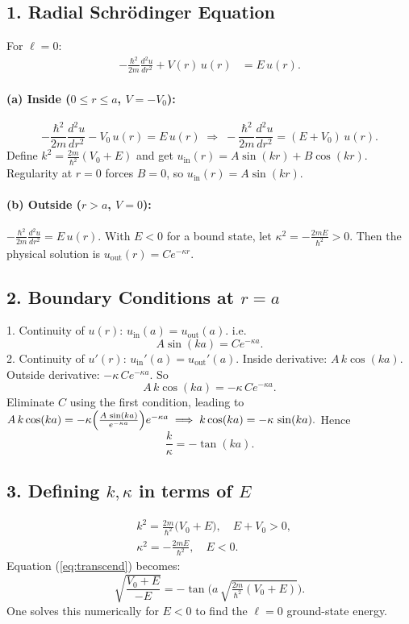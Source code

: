 \documentclass[12pt]{article}
\begin{document}
\subsection*{1. Radial Schr\"odinger Equation}
For $\ell=0$:
\begin{align*}
-\frac{\hbar^2}{2m}\frac{d^2 u}{dr^2} + V(r)\,u(r) &= E\,u(r).
\end{align*}
\paragraph{(a) Inside ($0\le r\le a$, $V=-V_0$):}
\[
-\frac{\hbar^2}{2m}\frac{d^2 u}{dr^2} - V_0\,u(r) = E\,u(r)\;\Longrightarrow\; -\frac{\hbar^2}{2m}\frac{d^2 u}{dr^2} = (E+V_0)\,u(r).
\]
Define $k^2 = \tfrac{2m}{\hbar^2}(V_0 + E)$ and get $u_{\text{in}}(r) = A\sin(kr) + B\cos(kr)$. Regularity at $r=0$ forces $B=0$, so $u_{\text{in}}(r)=A\sin(kr).$

\paragraph{(b) Outside ($r > a$, $V=0$):}
\(
-\frac{\hbar^2}{2m}\frac{d^2 u}{dr^2} = E\,u(r).\)
With $E<0$ for a bound state, let $\kappa^2 = -\tfrac{2mE}{\hbar^2}>0$. Then the physical solution is $u_{\text{out}}(r)=C e^{-\kappa r}.$

\subsection*{2. Boundary Conditions at $r=a$}
1. Continuity of $u(r)$: $u_{\text{in}}(a) = u_{\text{out}}(a)$. i.e.
\[
A\sin(ka) = C e^{-\kappa a}.
\]
2. Continuity of $u'(r)$: $u_{\text{in}}'(a) = u_{\text{out}}'(a)$. Inside derivative: $A\,k\cos(ka).$ Outside derivative: $-\kappa\,C e^{-\kappa a}.$ So
\[
A\,k\cos(ka) = -\kappa\,C e^{-\kappa a}.
\]
Eliminate $C$ using the first condition, leading to
\(
A\,k\cos(ka) = -\kappa\Bigl(\frac{A\,\sin(ka)}{e^{-\kappa a}}\Bigr)e^{-\kappa a}\;\Longrightarrow\; k\cos(ka) = -\kappa\,\sin(ka).\)
Hence
\begin{equation}
\label{eq:transcend}
\frac{k}{\kappa} = -\tan(ka).
\end{equation}
\subsection*{3. Defining $k,\kappa$ in terms of $E$}
\begin{align*}
&k^2 = \frac{2m}{\hbar^2}\bigl(V_0+E\bigr), \quad E+V_0>0,\\
&\kappa^2 = -\frac{2mE}{\hbar^2},\quad E<0.\
\end{align*}
Equation (\ref{eq:transcend}) becomes:
\begin{equation}
\sqrt{\frac{V_0 + E}{-E}} = -\tan\bigl(a\,\sqrt{\tfrac{2m}{\hbar^2}(V_0 + E)}\bigr).
\end{equation}
One solves this numerically for $E<0$ to find the $\ell=0$ ground-state energy.
\end{document}
